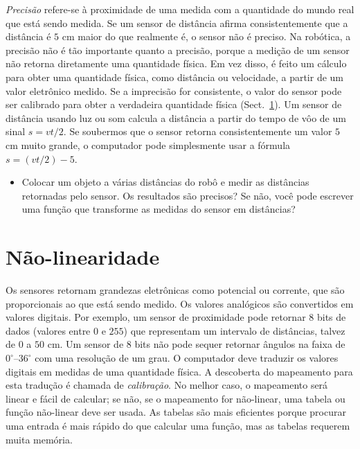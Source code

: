 {\emph{Precisão} refere-se à proximidade de uma medida com a quantidade do mundo real que está sendo medida. Se um sensor de distância afirma consistentemente que a distância é $5$ cm maior do que realmente é, o sensor não é preciso. Na robótica, a precisão não é tão importante quanto a precisão, porque a medição de um sensor não retorna diretamente uma quantidade física. Em vez disso, é feito um cálculo para obter uma quantidade física, como distância ou velocidade, a partir de um valor eletrônico medido. Se a imprecisão for consistente, o valor do sensor pode ser calibrado para obter a verdadeira quantidade física (Sect.~\ref{s.nonlinearity}). Um sensor de distância usando luz ou som calcula a distância a partir do tempo de vôo de um sinal $s=vt/2$. Se soubermos que o sensor retorna consistentemente um valor $5$ cm muito grande, o computador pode simplesmente usar a fórmula $s=(vt/2) - 5$.

\begin{framed}
\begin{itemize}
\item Colocar um objeto a várias distâncias do robô e medir as distâncias retornadas pelo sensor. Os resultados são precisos? Se não, você pode escrever uma função que transforme as medidas do sensor em distâncias?
\end{itemize}
\end{framed}

\section{Não-linearidade}\label{s.nonlinearity}

Os sensores retornam grandezas eletrônicas como potencial ou corrente, que são proporcionais ao que está sendo medido. Os valores analógicos são convertidos em valores digitais. Por exemplo, um sensor de proximidade pode retornar $8$ bits de dados (valores entre $0$ e $255$) que representam um intervalo de distâncias, talvez de $0$ a $50$ cm. Um sensor de $8$ bits não pode sequer retornar ângulos na faixa de $0^\circ$--$36^\circ$ com uma resolução de um grau. O computador deve traduzir os valores digitais em medidas de uma quantidade física. A descoberta do mapeamento para esta tradução é chamada de \emph{calibração}. No melhor caso, o mapeamento será linear e fácil de calcular; se não, se o mapeamento for não-linear, uma tabela ou função não-linear deve ser usada. As tabelas são mais eficientes porque procurar uma entrada é mais rápido do que calcular uma função, mas as tabelas requerem muita memória.

}
